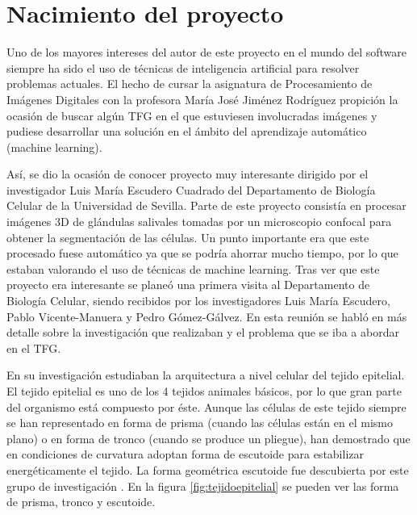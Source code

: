 \chapter{Nacimiento del proyecto}\label{nacimiento}

Uno de los mayores intereses del autor de este proyecto en el mundo del software siempre ha sido el uso de técnicas de inteligencia artificial para resolver problemas actuales. El hecho de cursar la asignatura de Procesamiento de Imágenes Digitales con la profesora María José Jiménez Rodríguez propición la ocasión de buscar algún TFG en el que estuviesen involucradas imágenes y pudiese desarrollar una solución en el ámbito del aprendizaje automático (machine learning).

Así, se dio la ocasión de conocer proyecto muy interesante dirigido por el investigador Luis María Escudero Cuadrado del Departamento de Biología Celular de la Universidad de Sevilla. Parte de este proyecto consistía en procesar imágenes 3D de glándulas salivales tomadas por un microscopio confocal para obtener la segmentación de las células. Un punto importante era que este procesado fuese automático ya que se podría ahorrar mucho tiempo, por lo que estaban valorando el uso de técnicas de machine learning. Tras ver que este proyecto era interesante se planeó una primera visita al Departamento de Biología Celular, siendo recibidos por los investigadores Luis María Escudero, Pablo Vicente-Manuera y Pedro Gómez-Gálvez. En esta reunión se habló en más detalle sobre la investigación que realizaban y el problema que se iba a abordar en el TFG.

En su investigación estudiaban la arquitectura a nivel celular del tejido epitelial. El tejido epitelial es uno de los 4 tejidos animales básicos, por lo que gran parte del organismo está compuesto por éste. Aunque las células de este tejido siempre se han representado en forma de prisma (cuando las células están en el mismo plano) o en forma de tronco (cuando se produce un pliegue), han demostrado que en condiciones de curvatura adoptan forma de escutoide para estabilizar energéticamente el tejido. La forma geométrica escutoide fue descubierta por este grupo de investigación \cite{GomezGalvez2018}. En la figura \ref{fig:tejidoepitelial} se pueden ver las forma de prisma, tronco y escutoide.


